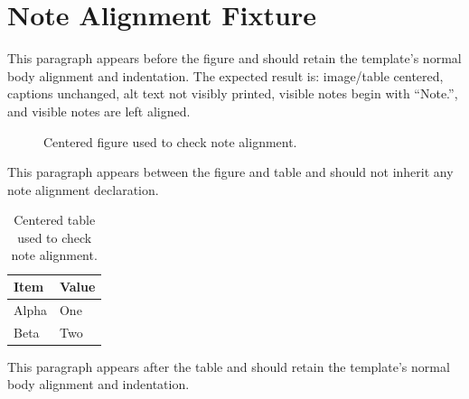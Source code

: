 \documentclass{ndsudisq}
\begin{document}
\mainmattersetup

\chapter{Note Alignment Fixture}

This paragraph appears before the figure and should retain the template's normal body alignment and indentation. The expected result is: image/table centered, captions unchanged, alt text not visibly printed, visible notes begin with ``Note.'', and visible notes are left aligned.

\begin{figure}[htbp]
\centering
{}
\caption{Centered figure used to check note alignment.}
\label{fig:note-alignment-fixture}
\end{figure}

This paragraph appears between the figure and table and should not inherit any note alignment declaration.

\begin{table}[htbp]
\centering
\caption{Centered table used to check note alignment.}
\label{tab:note-alignment-fixture}
\begin{tabular}{ll}
\toprule
Item & Value \\
\midrule
Alpha & One \\
Beta & Two \\
\bottomrule
\end{tabular}
\end{table}

This paragraph appears after the table and should retain the template's normal body alignment and indentation.
\end{document}
